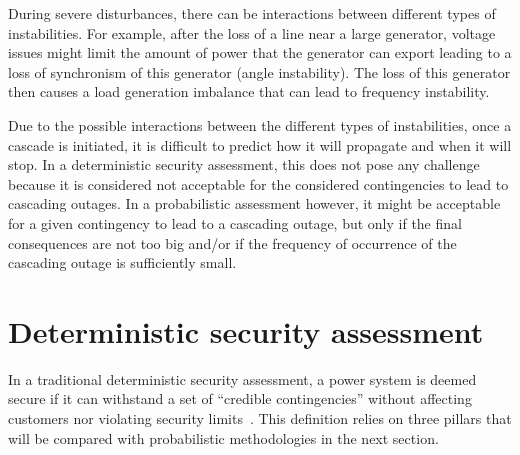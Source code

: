 During severe disturbances, there can be interactions between different types of instabilities. For example, after the loss of a line near a large generator, voltage issues might limit the amount of power that the generator can export leading to a loss of synchronism of this generator (angle instability). The loss of this generator then causes a load generation imbalance that can lead to frequency instability.


Due to the possible interactions between the different types of instabilities, once a cascade is initiated, it is difficult to predict how it will propagate and when it will stop. In a deterministic security assessment, this does not pose any challenge because it is considered not acceptable for the considered contingencies to lead to cascading outages. In a probabilistic assessment however, it might be acceptable for a given contingency to lead to a cascading outage, but only if the final consequences are not too big and/or if the frequency of occurrence of the cascading outage is sufficiently small.


\section{Deterministic security assessment}
\label{sec:traditionalSecurity}

In a traditional deterministic security assessment, a power system is deemed secure if it can withstand a set of ``credible contingencies'' without affecting customers nor violating security limits~\cite{N-1-ENTSOE}. This definition relies on three pillars that will be compared with probabilistic methodologies in the next section.

